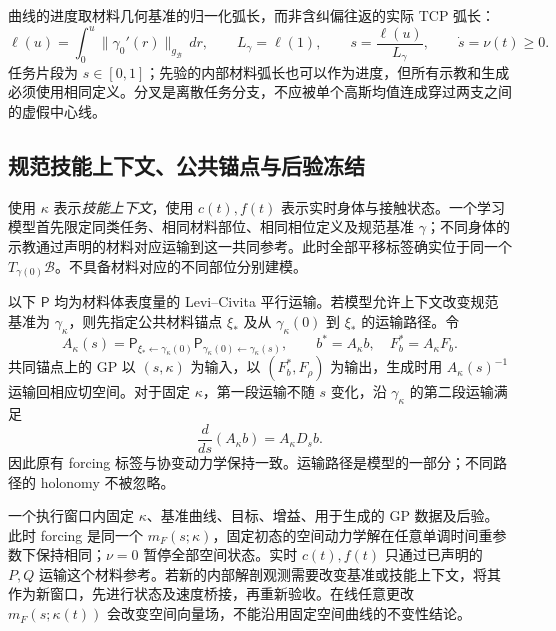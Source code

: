 \documentclass[11pt,a4paper]{article}
\numberwithin{equation}{section}
\theoremstyle{definition}
\begin{document}
曲线的进度取材料几何基准的归一化弧长，而非含纠偏往返的实际 TCP 弧长：
\begin{equation}
 \ell(u)=\int_0^u\|\gamma_0'(r)\|_{g_{\mathcal B}}\,dr,\qquad
 L_\gamma=\ell(1),\qquad s=\frac{\ell(u)}{L_\gamma},\qquad
 \dot s=\nu(t)\ge0.
 \label{eq:v43-material-progress}
\end{equation}
任务片段为 $s\in[0,1]$；先验的内部材料弧长也可以作为进度，但所有示教和生成必须使用相同定义。分叉是离散任务分支，不应被单个高斯均值连成穿过两支之间的虚假中心线。

\subsection{规范技能上下文、公共锚点与后验冻结}
\label{sec:rev:canonical-skill}
使用 $\kappa$ 表示\emph{技能上下文}，使用 $c(t),f(t)$ 表示实时身体与接触状态。一个学习模型首先限定同类任务、相同材料部位、相同相位定义及规范基准 $\gamma$；不同身体的示教通过声明的材料对应运输到这一共同参考。此时全部平移标签确实位于同一个 $T_{\gamma(0)}\mathcal B$。不具备材料对应的不同部位分别建模。

以下 $\mathsf P$ 均为材料体表度量的 Levi--Civita 平行运输。若模型允许上下文改变规范基准为 $\gamma_\kappa$，则先指定公共材料锚点 $\xi_\ast$ 及从 $\gamma_\kappa(0)$ 到 $\xi_\ast$ 的运输路径。令
\begin{equation}
 A_\kappa(s)=
 \mathsf P_{\xi_\ast\leftarrow\gamma_\kappa(0)}
 \mathsf P_{\gamma_\kappa(0)\leftarrow\gamma_\kappa(s)},\qquad
 b^\ast=A_\kappa b,\quad F_b^\ast=A_\kappa F_b.
 \label{eq:rev:common-anchor}
\end{equation}
共同锚点上的 GP 以 $(s,\kappa)$ 为输入，以 $(F_b^\ast,F_\rho)$ 为输出，生成时用 $A_\kappa(s)^{-1}$ 运输回相应切空间。对于固定 $\kappa$，第一段运输不随 $s$ 变化，沿 $\gamma_\kappa$ 的第二段运输满足
\begin{equation}
 \frac{d}{ds}(A_\kappa b)=A_\kappa D_sb.
 \label{eq:rev:anchor-derivative}
\end{equation}
因此原有 forcing 标签与协变动力学保持一致。运输路径是模型的一部分；不同路径的 holonomy 不被忽略。

一个执行窗口内固定 $\kappa$、基准曲线、目标、增益、用于生成的 GP 数据及后验。此时 forcing 是同一个 $m_F(s;\kappa)$，固定初态的空间动力学解在任意单调时间重参数下保持相同；$\nu=0$ 暂停全部空间状态。实时 $c(t),f(t)$ 只通过已声明的 $P,Q$ 运输这个材料参考。若新的内部解剖观测需要改变基准或技能上下文，将其作为新窗口，先进行状态及速度桥接，再重新验收。在线任意更改 $m_F(s;\kappa(t))$ 会改变空间向量场，不能沿用固定空间曲线的不变性结论。
\end{document}
